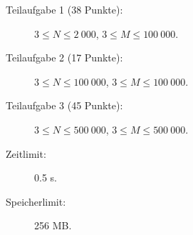 \documentclass{boi2014-de}
\begin{document}
    \Scoring

    \begin{description}
        \item[Teilaufgabe 1 (38 Punkte):] $3 \le N \le 2\ 000$, $3 \le M \le 100\ 000$.
        \item[Teilaufgabe 2 (17 Punkte):] $3 \le N \le 100\ 000$, $3 \le M \le 100\ 000$.
        \item[Teilaufgabe 3 (45 Punkte):] $3 \le N \le 500\ 000$, $3 \le M \le 500\ 000$.
    \end{description}

    \Constraints

    \begin{description}
        \item[Zeitlimit:] 0.5 s.
        \item[Speicherlimit:] 256 MB.
    \end{description}
\end{document}
